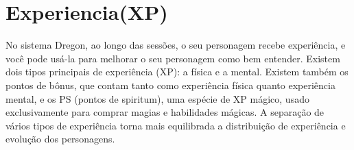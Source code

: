 





\section{Experiencia(XP)}

No sistema Dregon, ao longo das sessões, o seu personagem recebe experiência, e você pode usá-la para melhorar o seu personagem como bem entender. Existem dois tipos principais de experiência (XP): a física e a mental. Existem também os pontos de bônus, que contam tanto como experiência física quanto experiência mental, e os PS (pontos de spiritum), uma espécie de XP mágico, usado exclusivamente para comprar magias e habilidades mágicas. A separação de vários tipos de experiência torna mais equilibrada a distribuição de experiência e evolução dos personagens.


